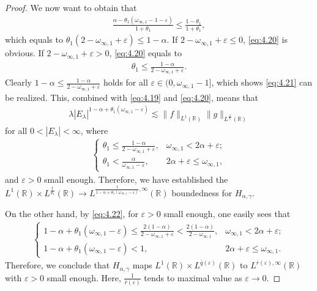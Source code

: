 \documentclass[11pt, twoside, leqno]{article}
\theoremstyle{definition}
\numberwithin{equation}{section}
\begin{document}
\begin{proof}
We now want to obtain that
\begin{align}\label{eq:4.20}
\frac{\alpha-\theta_1(\omega_{\infty,1}-1-\varepsilon)}{1+\theta_1}\leq \frac{1-\theta_{1}}{1+\theta_{1}},
\end{align}
which equals to $\theta_1(2-\omega_{\infty,1}+\varepsilon)\leq1-\alpha$. If $2-\omega_{\infty,1}+\varepsilon\leq0$, \eqref{eq:4.20} is obvious. If $2-\omega_{\infty,1}+\varepsilon>0$, \eqref{eq:4.20} equals to
\begin{align}\label{eq:4.21}
\theta_1\leq\frac{1-\alpha}{2-\omega_{\infty,1}+\varepsilon}.
\end{align}
Clearly $1-\alpha\leq\frac{1-\alpha}{2-\omega_{\infty,1}+\varepsilon}$ holds for all $\varepsilon\in(0,\omega_{\infty,1}-1]$, which shows \eqref{eq:4.21} can be realized. This, combined with \eqref{eq:4.19} and \eqref{eq:4.20}, means that
\begin{align*}
\lambda|E_{\lambda}|^{1-\alpha+\theta_1(\omega_{\infty,1}-\varepsilon)}\lesssim\|f\|_{L^{1}(\mathbb{R})}\|g\|_{L^{\frac{1}{\theta_1}}(\mathbb{R})}
\end{align*}
for all $0<|E_\lambda|<\infty$, where
\begin{align}\label{eq:4.22}
\begin{cases}
\theta_1\leq\frac{1-\alpha}{2-\omega_{\infty,1}+\varepsilon}, &\omega_{\infty,1}<2\alpha+\varepsilon;\\
 \theta_1< \frac{\alpha}{\omega_{\infty,1}-\varepsilon}, & 2\alpha+\varepsilon\leq\omega_{\infty,1},
\end{cases}
\end{align}
and $\varepsilon>0$ small enough. Therefore, we have established the $L^{1}(\mathbb{R})\times L^{\frac{1}{\theta_{1}}}(\mathbb{R})\rightarrow L^{\frac{1}{1-\alpha+\theta_1(\omega_{\infty,1}-\varepsilon)}, \infty}(\mathbb{R})$ boundedness for $H_{\alpha,\gamma}$.

On the other hand, by \eqref{eq:4.22}, for $\varepsilon>0$ small enough, one easily sees that
\begin{align*}
\begin{cases}
1-\alpha+\theta_1(\omega_{\infty,1}-\varepsilon)\leq\frac{2(1-\alpha)}{2-\omega_{\infty,1}+\varepsilon}<\frac{2(1-\alpha)}{2-\omega_{\infty,1}}, &\omega_{\infty,1}<2\alpha+\varepsilon;\\
 1-\alpha+\theta_1(\omega_{\infty,1}-\varepsilon)< 1, & 2\alpha+\varepsilon\leq\omega_{\infty,1}.
\end{cases}
\end{align*}
Therefore, we conclude that $H_{\alpha,\gamma}$ maps $L^{1}(\mathbb{R})\times L^{\bar{q}( \varepsilon )   }(\mathbb{R})$ to $L^{\bar{r}(\varepsilon ), \infty}(\mathbb{R})$ with $\varepsilon>0$ small enough. Here, $\frac{1}{\bar{r}( \varepsilon )}$ tends to maximal value as $\varepsilon\rightarrow 0$.


\end{proof}
\end{document}
